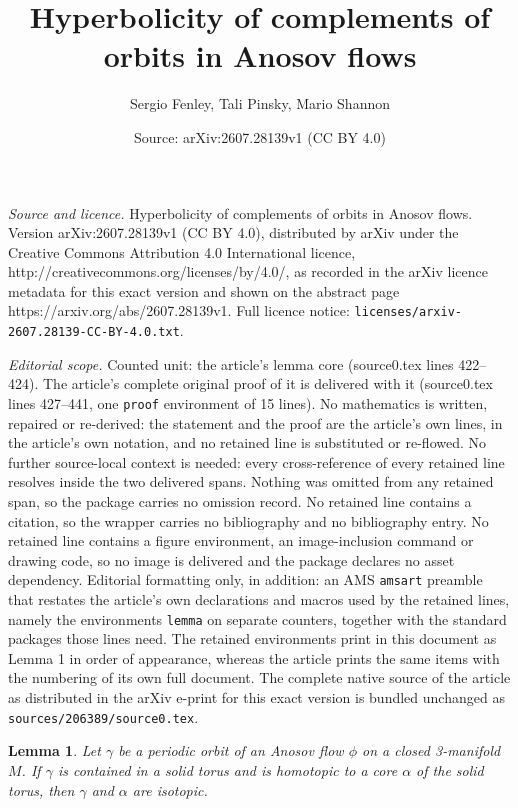 \documentclass[10pt,a4paper]{amsart}
\title{Hyperbolicity of complements of orbits in Anosov flows}
\author{Sergio Fenley, Tali Pinsky, Mario Shannon}
\date{Source: arXiv:2607.28139v1 (CC BY 4.0)}
\newtheorem{lemma}{Lemma}
\begin{document}
\maketitle

\noindent\emph{Source and licence.} Hyperbolicity of complements of orbits in Anosov flows. Version arXiv:2607.28139v1 (CC BY 4.0), distributed by arXiv under the Creative Commons Attribution 4.0 International licence, http://creativecommons.org/licenses/by/4.0/, as recorded in the arXiv licence metadata for this exact version and shown on the abstract page https://arxiv.org/abs/2607.28139v1. Full licence notice: \texttt{licenses/arxiv-2607.28139-CC-BY-4.0.txt}.\par\smallskip

\noindent\textit{Editorial scope.} Counted unit: the article's lemma core (source0.tex lines 422--424). The article's complete original proof of it is delivered with it (source0.tex lines 427--441, one \texttt{proof} environment of 15 lines). No mathematics is written, repaired or re-derived: the statement and the proof are the article's own lines, in the article's own notation, and no retained line is substituted or re-flowed.  No further source-local context is needed: every cross-reference of every retained line resolves inside the two delivered spans.  Nothing was omitted from any retained span, so the package carries no omission record.  No retained line contains a citation, so the wrapper carries no bibliography and no bibliography entry.  No retained line contains a figure environment, an image-inclusion command or drawing code, so no image is delivered and the package declares no asset dependency.  Editorial formatting only, in addition: an AMS \texttt{amsart} preamble that restates the article's own declarations and macros used by the retained lines, namely the environments \texttt{lemma} on separate counters, together with the standard packages those lines need.  The retained environments print in this document as Lemma 1 in order of appearance, whereas the article prints the same items with the numbering of its own full document.  The complete native source of the article as distributed in the arXiv e-print for this exact version is bundled unchanged as \texttt{sources/206389/source0.tex}.
\begin{lemma}\label{lem:isotopic to core}
Let $\gamma$ be a periodic orbit of an Anosov flow $\phi$ on a closed 3-manifold $M$. If $\gamma$ is contained in a solid torus and is homotopic to a core $\alpha$ of the solid torus, then $\gamma$ and $\alpha$ are isotopic.
\end{lemma}
\end{document}
